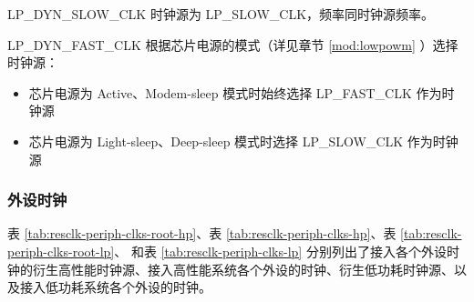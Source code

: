 \documentclass[main\_\_CN.tex]{subfiles}
\begin{document}
LP\_DYN\_SLOW\_CLK 时钟源为 LP\_SLOW\_CLK，频率同时钟源频率。

LP\_DYN\_FAST\_CLK 根据芯片电源的模式（详见章节 \ref{mod:lowpowm} \textit{}）选择时钟源：

\begin{itemize}
    \item 芯片电源为 Active、Modem-sleep 模式时始终选择 LP\_FAST\_CLK 作为时钟源
    \item 芯片电源为 Light-sleep、Deep-sleep 模式时选择 LP\_SLOW\_CLK 作为时钟源
\end{itemize}

\subsubsection{外设时钟}
表 \ref{tab:resclk-periph-clks-root-hp}、表 \ref{tab:resclk-periph-clks-hp}、表 \ref{tab:resclk-periph-clks-root-lp}、 和表 \ref{tab:resclk-periph-clks-lp} 分别列出了接入各个外设时钟的衍生高性能时钟源、接入高性能系统各个外设的时钟、衍生低功耗时钟源、以及接入低功耗系统各个外设的时钟。
\end{document}
